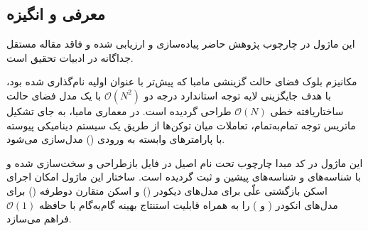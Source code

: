 \subsection{معرفی و انگیزه}
این ماژول در چارچوب پژوهش حاضر پیاده‌سازی و ارزیابی شده و فاقد مقاله مستقل جداگانه در ادبیات تحقیق است.

مکانیزم بلوک فضای حالت گزینشی مامبا  که پیش‌تر با عنوان اولیه  نام‌گذاری شده بود، با هدف جایگزینی لایه توجه استاندارد درجه دو $\mathcal{O}(N^2)$ با یک مدل فضای حالت ساختاریافته خطی $\mathcal{O}(N)$ طراحی گردیده است. در معماری مامبا، به جای تشکیل ماتریس توجه تمام‌به‌تمام، تعاملات میان توکن‌ها از طریق یک سیستم دینامیکی پیوسته با پارامترهای وابسته به ورودی () مدل‌سازی می‌شود.

این ماژول در کد مبدا چارچوب تحت نام اصیل  در فایل  بازطراحی و سخت‌سازی شده و با شناسه‌های  و شناسه‌های پیشین  و  ثبت گردیده است. ساختار این ماژول امکان اجرای اسکن بازگشتی علّی برای مدل‌های دیکودر () و اسکن متقارن دوطرفه () برای مدل‌های انکودر ( و ) را به همراه قابلیت استنتاج بهینه گام‌به‌گام با حافظه $\mathcal{O}(1)$ فراهم می‌سازد.
